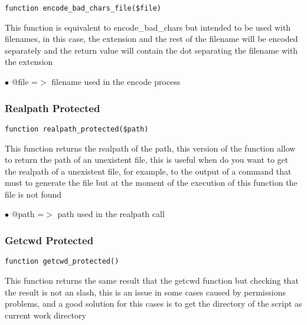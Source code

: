 \documentclass[a4paper]{article}
\begin{document}
\begin{lstlisting}
function encode_bad_chars_file($file)
\end{lstlisting}

This function is equivalent to encode\_bad\_chars but intended to be used
with filenames, in this case, the extension and the rest of the filename
will be encoded separately and the return value will contain the dot
separating the filename with the extension

\begin{compactitem}
\item[\color{myblue}$\bullet$] @file =$>$ filename used in the encode process
\end{compactitem}

\hypertarget{toc136}{}
\subsubsection{Realpath Protected}

\begin{lstlisting}
function realpath_protected($path)
\end{lstlisting}

This function returns the realpath of the path, this version of the function
allow to return the path of an unexistent file, this is useful when do you
want to get the realpath of a unexistent file, for example, to the output of
a command that must to generate the file but at the moment of the execution
of this function the file is not found

\begin{compactitem}
\item[\color{myblue}$\bullet$] @path =$>$ path used in the realpath call
\end{compactitem}

\hypertarget{toc137}{}
\subsubsection{Getcwd Protected}

\begin{lstlisting}
function getcwd_protected()
\end{lstlisting}

This function returns the same result that the getcwd function but checking
that the result is not an slash, this is an issue in some cases caused by
permissions problems, and a good solution for this cases is to get the directory
of the script as current work directory
\end{document}
